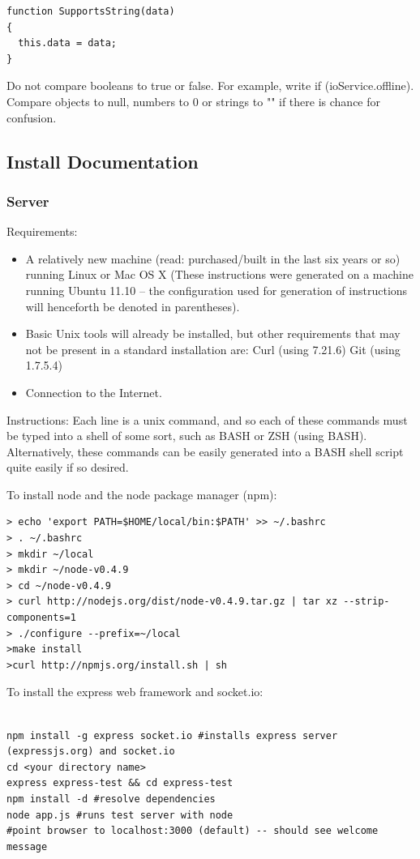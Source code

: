 \documentclass[letterpaper,12pt]{article}
\begin{document}
\begin{verbatim}
function SupportsString(data)
{
  this.data = data;
}
\end{verbatim}
Do not compare booleans to true or false. For example, write if (ioService.offline). Compare objects to null, numbers to 0 or strings to "" if there is chance for confusion.

\subsection{Install Documentation}
\subsubsection{Server}
Requirements:
\begin{itemize}
\item A relatively new machine (read: purchased/built in the last six years or so) running Linux or Mac OS X (These instructions were generated on a machine running Ubuntu 11.10 -- the configuration used for generation of instructions will henceforth be denoted in parentheses).
\item Basic Unix tools will already be installed, but other requirements that may not be present in a standard installation are:
Curl (using 7.21.6)
Git (using 1.7.5.4)
\item Connection to the Internet. 
\end{itemize}
Instructions:
Each line is a unix command, and so each of these commands must be typed into a shell of some sort, such as BASH or ZSH (using BASH). Alternatively, these commands can be easily generated into a BASH shell script quite easily if so desired.

To install node and the node package manager (npm):

\begin{verbatim}
> echo 'export PATH=$HOME/local/bin:$PATH' >> ~/.bashrc
> . ~/.bashrc
> mkdir ~/local
> mkdir ~/node-v0.4.9
> cd ~/node-v0.4.9
> curl http://nodejs.org/dist/node-v0.4.9.tar.gz | tar xz --strip-components=1
> ./configure --prefix=~/local
>make install
>curl http://npmjs.org/install.sh | sh
\end{verbatim}

To install the express web framework and socket.io:

\begin{verbatim}

npm install -g express socket.io #installs express server (expressjs.org) and socket.io
cd <your directory name>
express express-test && cd express-test
npm install -d #resolve dependencies
node app.js #runs test server with node
#point browser to localhost:3000 (default) -- should see welcome message
\end{verbatim}
\end{document}
